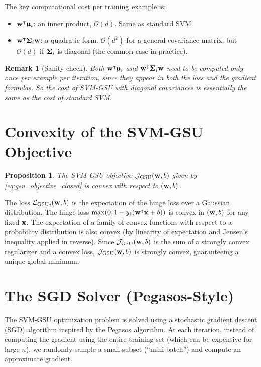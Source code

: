 \documentclass[11pt, letterpaper]{article}
\newcommand{\bSigma}{\vb{\Sigma}}
\newcommand{\bmu}{\boldsymbol{\upmu}}
\newcommand{\loss}{\mathcal{L}}
\newcommand{\obj}{\mathcal{J}}
\newtheorem{proposition}[theorem]{Proposition}
\newtheorem{remark}{Remark}[section]
\begin{document}
The key computational cost per training example is:
\begin{itemize}[leftmargin=2em]
    \item $\vb{w}^{\intercal} \bmu_i$: an inner product, $\mathcal{O}(d)$. Same as standard SVM.
    \item $\vb{w}^{\intercal} \bSigma_i \vb{w}$: a quadratic form. $\mathcal{O}(d^2)$ for a general covariance matrix, but $\mathcal{O}(d)$ if $\bSigma_i$ is diagonal (the common case in practice).
\end{itemize}

\begin{remark}[Sanity check]
Both $\vb{w}^{\intercal}\bmu_i$ and $\vb{w}^{\intercal}\bSigma_i\vb{w}$ need to be computed only \emph{once} per example per iteration, since they appear in both the loss and the gradient formulas. So the cost of SVM-GSU with diagonal covariances is essentially the same as the cost of standard SVM.
\end{remark}

\section{Convexity of the SVM-GSU Objective}

\begin{proposition}
The SVM-GSU objective $\obj_{\text{GSU}} (\vb{w}, b)$ given by \cref{eq:gsu_objective_closed} is convex with respect to $(\vb{w}, b)$.
\end{proposition}

The loss ${\loss_{\text{GSU}}}_{i}(\vb{w}, b)$ is the expectation of the hinge loss over a Gaussian distribution. The hinge loss $\max(0, 1 - y_i(\vb{w}^{\intercal} \vb{x} + b))$ is convex in $(\vb{w}, b)$ for any fixed $\vb{x}$. The expectation of a family of convex functions with respect to a probability distribution is also convex (by linearity of expectation and Jensen's inequality applied in reverse). Since $\obj_{\text{GSU}} (\vb{w}, b)$ is the sum of a strongly convex regularizer and a convex loss, $\obj_{\text{GSU}} (\vb{w}, b)$ is strongly convex, guaranteeing a unique global minimum.

\section{The SGD Solver (Pegasos-Style)}\label{sec:sgd_solver}

The SVM-GSU optimization problem is solved using a stochastic gradient descent (SGD) algorithm inspired by the Pegasos algorithm. At each iteration, instead of computing the gradient using the entire training set (which can be expensive for large $n$), we randomly sample a small subset (``mini-batch'') and compute an approximate gradient.
\end{document}
